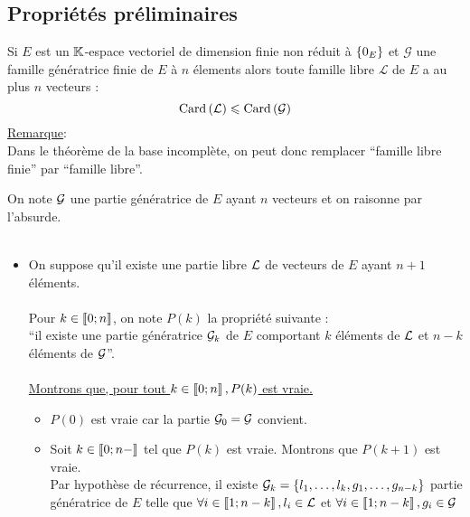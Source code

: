 \subsection{Propriétés préliminaires}
\begin{defprop}
    Si \(E\) est un \(\K\)-espace vectoriel de dimension finie non réduit à \(\accol{0_E}\) et \(\mathcal{G}\) une famille génératrice finie de \(E\) à \(n\) élements alors toute famille libre \(\mathcal{L}\) de \(E\) a au plus \(n\) vecteurs :
    \[\Card{\mathcal{L}} \leq \Card{\mathcal{G}} \]
    \underline{Remarque}:\\
    Dans le théorème de la base incomplète, on peut donc remplacer “famille libre finie” par “famille libre”.
\end{defprop}
\begin{dem}
    On note \(\cal{G}\) une partie génératrice de \(E\) ayant \(n\) vecteurs et on raisonne par l’absurde.\\~\\
    \begin{itemize}
        \item On suppose qu’il existe une partie libre \(\cal{L}\) de vecteurs de \(E\) ayant \(n + 1\) éléments.\\~\\
        Pour \(k \in \interventierii{0}{n}\), on note \(P(k)\) la propriété suivante :\\
        “il existe une partie génératrice \(\cal{G}_k\) de \(E\) comportant \(k\) éléments de \(\cal{L}\) et \(n - k\) éléments de \(\cal{G}\)”.\\~\\
        \underline{Montrons que, pour tout \(k \in \interventierii{0}{n}, P(k)\) est vraie.}
        \begin{itemize}
            \item \(P(0)\) est vraie car la partie \(\cal{G}_0 = \cal{G}\) convient.\\
            \item Soit \(k \in \interventierii{0}{n-}\) tel que \(P(k)\) est vraie. Montrons que \(P(k + 1)\) est vraie.\\
             Par hypothèse de récurrence, il existe \(\cal{G}_k = \accol{l_1, \dots , l_k, g_1, \dots , g_{n-k}}\) partie génératrice de \(E\) telle que \(\forall i \in \interventierii{1}{n-k} , l_i \in \cal{L}\) et \(\forall i \in \interventierii{1}{n-k} , g_i \in \cal{G}\)\\~\\

\end{itemize}
\end{itemize}
\end{dem}
